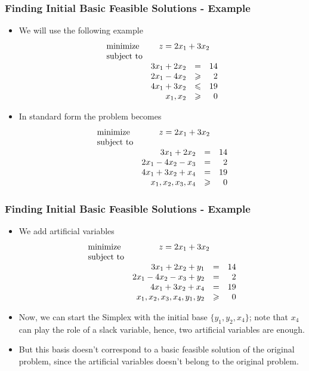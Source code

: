 \documentclass{beamer}
\theoremstyle{plain}
\let\le\leqslant
\let\ge\geqslant
\begin{document}
\begin{frame}\frametitle{Finding Initial Basic Feasible Solutions - Example}
\justifying

\begin{itemize}
\justifying

\item We will use the following example
\[ \begin{array}{lrcr}
\textrm{minimize} & \multicolumn{3}{c}{z = 2x_1 + 3x_2}  \\
\textrm{subject to} & \\
& 3x_1 + 2x_2 & = & 14 \\
& 2x_1 - 4x_2 & \ge & 2 \\
& 4x_1 + 3x_2 & \le & 19 \\
& x_1, x_2 & \ge & 0
\end{array}
\]

\item In standard form the problem becomes
\[ \begin{array}{lrcr}
\textrm{minimize} & \multicolumn{3}{c}{z = 2x_1 + 3x_2}  \\
\textrm{subject to} & \\
& 3x_1 + 2x_2 & = & 14 \\
& 2x_1 - 4x_2 - x_3 & = & 2 \\
& 4x_1 + 3x_2 + x_4 & = & 19 \\
& x_1, x_2, x_3, x_4 & \ge & 0
\end{array}
\]

\end{itemize}

\end{frame}

\begin{frame}\frametitle{Finding Initial Basic Feasible Solutions - Example}
\justifying

\begin{itemize}
\justifying

\item We add artificial variables 
\[ \begin{array}{lrcr}
\textrm{minimize} & \multicolumn{3}{c}{z = 2x_1 + 3x_2}  \\
\textrm{subject to} & \\
& 3x_1 + 2x_2 + y_1& = & 14 \\
& 2x_1 - 4x_2 - x_3 + y_2 & = & 2 \\
& 4x_1 + 3x_2 + x_4 & = & 19 \\
& x_1, x_2, x_3, x_4, y_1, y_2 & \ge & 0
\end{array}
\]

\item Now, we can start the Simplex with the initial base $ \{ y_1, y_2, x_4 \} $; note that $ x_4 $ can play the role of a slack variable, hence, two artificial variables are enough.

\item But this basis doesn't correspond to a basic feasible solution of the original problem, since the artificial variables doesn't belong to the original problem.

\end{itemize}

\end{frame}
\end{document}
